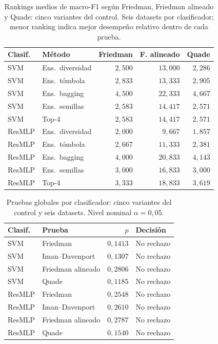 \documentclass[11pt,a4paper]{article}
\begin{document}
\begin{table}[H]
\centering\fontsize{8}{10}\selectfont\setlength{\tabcolsep}{3.0pt}
\caption{Rankings medios de macro-F1 según Friedman, Friedman alineado y Quade: cinco variantes del control. Seis datasets por clasificador; menor ranking indica mejor desempeño relativo dentro de cada prueba.}
\label{tab:sel-control-rankings}
\begin{tabular}{@{}llrrr@{}}
\toprule
Clasif. & Método & Friedman & F. alineado & Quade \\
\midrule
SVM & Ens.\ diversidad & $2{,}500$ & $13{,}000$ & $2{,}286$ \\
SVM & Ens.\ tómbola & $2{,}833$ & $13{,}333$ & $2{,}905$ \\
SVM & Ens.\ bagging & $4{,}500$ & $22{,}333$ & $4{,}667$ \\
SVM & Ens.\ semillas & $2{,}583$ & $14{,}417$ & $2{,}571$ \\
SVM & Top-4 & $2{,}583$ & $14{,}417$ & $2{,}571$ \\
ResMLP & Ens.\ diversidad & $2{,}000$ & $9{,}667$ & $1{,}857$ \\
ResMLP & Ens.\ tómbola & $2{,}667$ & $11{,}333$ & $2{,}381$ \\
ResMLP & Ens.\ bagging & $4{,}000$ & $20{,}833$ & $4{,}143$ \\
ResMLP & Ens.\ semillas & $3{,}000$ & $16{,}833$ & $3{,}000$ \\
ResMLP & Top-4 & $3{,}333$ & $18{,}833$ & $3{,}619$ \\
\bottomrule
\end{tabular}
\end{table}
\begin{table}[H]
\centering\fontsize{8}{10}\selectfont\setlength{\tabcolsep}{3.0pt}
\caption{Pruebas globales por clasificador: cinco variantes del control y seis datasets. Nivel nominal $\alpha=0{,}05$.}
\label{tab:sel-control-global}
\begin{tabular}{@{}llrl@{}}
\toprule
Clasif. & Prueba & $p$ & Decisión \\
\midrule
SVM & Friedman & $0{,}1413$ & No rechazo \\
SVM & Iman--Davenport & $0{,}1307$ & No rechazo \\
SVM & Friedman alineado & $0{,}2806$ & No rechazo \\
SVM & Quade & $0{,}1185$ & No rechazo \\
ResMLP & Friedman & $0{,}2548$ & No rechazo \\
ResMLP & Iman--Davenport & $0{,}2610$ & No rechazo \\
ResMLP & Friedman alineado & $0{,}2787$ & No rechazo \\
ResMLP & Quade & $0{,}1540$ & No rechazo \\
\bottomrule
\end{tabular}
\end{table}
\end{document}

